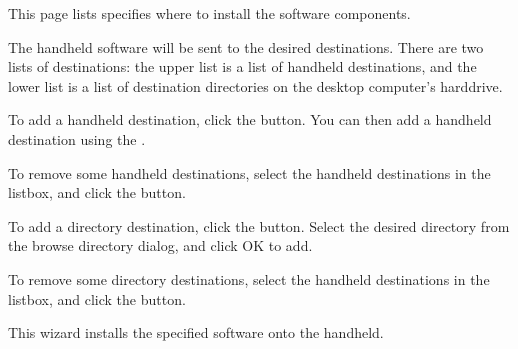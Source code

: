 
This page lists specifies where to install the software components. 

The handheld software will be sent to the desired destinations. There are two 
lists of destinations: the upper list is a list of handheld destinations, and 
the lower list is a list of destination directories on the desktop computer's 
harddrive.

To add a handheld destination, click the  
button. You can then add a handheld destination using the
\helpignore{\ref{sec:pd-handheld-dest-dialog}}
.

To remove some handheld destinations, select the handheld destinations in 
the listbox, and click the  button.

To add a directory destination, click the 
 button. Select the desired directory 
from the browse directory dialog, and click OK to add. 

To remove some directory destinations, select the handheld destinations in 
the listbox, and click the  button.


This wizard installs the specified \brandingapplicationsuitename software onto the handheld.



